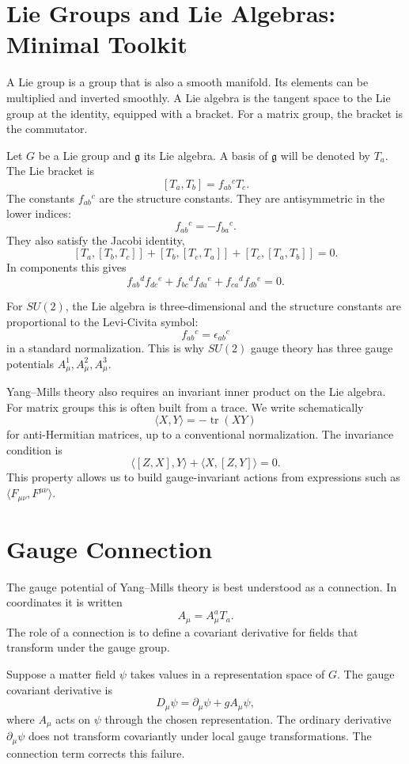 \section{Lie Groups and Lie Algebras: Minimal Toolkit}

A Lie group is a group that is also a smooth manifold. Its elements can be
multiplied and inverted smoothly. A Lie algebra is the tangent space to the Lie
group at the identity, equipped with a bracket. For a matrix group, the bracket
is the commutator.

Let \(G\) be a Lie group and \(\mathfrak{g}\) its Lie algebra. A basis of
\(\mathfrak{g}\) will be denoted by \(T_a\). The Lie bracket is
\[
    [T_a,T_b]=f_{ab}{}^cT_c.
\]
The constants \(f_{ab}{}^c\) are the structure constants. They are antisymmetric
in the lower indices:
\[
    f_{ab}{}^c=-f_{ba}{}^c.
\]
They also satisfy the Jacobi identity,
\[
    [T_a,[T_b,T_c]]+[T_b,[T_c,T_a]]+[T_c,[T_a,T_b]]=0.
\]
In components this gives
\[
    f_{ab}{}^d f_{dc}{}^e
    +f_{bc}{}^d f_{da}{}^e
    +f_{ca}{}^d f_{db}{}^e=0.
\]

\begin{examplebox}
For \(SU(2)\), the Lie algebra is three-dimensional and the structure constants
are proportional to the Levi-Civita symbol:
\[
    f_{ab}{}^c=\epsilon_{ab}{}^c
\]
in a standard normalization. This is why \(SU(2)\) gauge theory has three gauge
potentials \(A_\mu^1,A_\mu^2,A_\mu^3\).
\end{examplebox}

Yang--Mills theory also requires an invariant inner product on the Lie algebra.
For matrix groups this is often built from a trace. We write schematically
\[
    \langle X,Y\rangle=-\operatorname{tr}(XY)
\]
for anti-Hermitian matrices, up to a conventional normalization. The invariance
condition is
\[
    \langle [Z,X],Y\rangle+\langle X,[Z,Y]\rangle=0.
\]
This property allows us to build gauge-invariant actions from expressions such
as \(\langle F_{\mu\nu},F^{\mu\nu}\rangle\).

\section{Gauge Connection}

The gauge potential of Yang--Mills theory is best understood as a connection.
In coordinates it is written
\[
    A_\mu=A_\mu^aT_a.
\]
The role of a connection is to define a covariant derivative for fields that
transform under the gauge group.

Suppose a matter field \(\psi\) takes values in a representation space of
\(G\). The gauge covariant derivative is
\[
    D_\mu\psi=\partial_\mu\psi+gA_\mu\psi,
\]
where \(A_\mu\) acts on \(\psi\) through the chosen representation. The ordinary
derivative \(\partial_\mu\psi\) does not transform covariantly under local gauge
transformations. The connection term corrects this failure.


